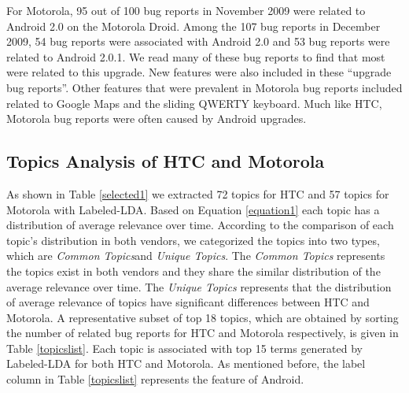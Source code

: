 \documentclass[10pt, conference, compsocconf]{IEEEtran}
\begin{document}
For Motorola,  95 out of 100 bug
reports in November 2009 were related to Android 2.0 on the Motorola Droid.
Among the 107 bug reports in December 2009, 54 bug reports were
associated with Android 2.0 and 53 bug reports were related to Android
2.0.1. 
We read many of these bug reports to find that most were related to this upgrade.
New features were also included in these ``upgrade bug reports''.
Other features that were prevalent in Motorola bug reports included
related to Google Maps and the sliding QWERTY keyboard. 
Much like HTC, Motorola bug reports were often caused by Android upgrades.


\subsection{Topics Analysis of HTC and Motorola}

As shown in Table \ref{selected1} we extracted 72 topics for HTC and
57 topics for Motorola with Labeled-LDA.
Based on Equation \ref{equation1} each topic has a distribution of
average relevance over time. According to the comparison of each
topic's distribution in both vendors, we categorized the topics into
two types, which are \textit{Common Topics}and \textit{Unique Topics}.
The \textit{Common Topics} represents the topics exist in both vendors
and they share the similar distribution of the average relevance over
time.
The \textit{Unique Topics} represents that the distribution of average
relevance of topics have significant differences between HTC and
Motorola.
A representative subset of top 18 topics, which are obtained by
sorting the number of related bug reports for HTC and Motorola
respectively, is given in Table \ref{topicslist}.
Each topic is associated with top 15 terms generated by Labeled-LDA for
both HTC and Motorola. As mentioned before, the label column in Table
\ref{topicslist} represents the feature of Android.
\end{document}
